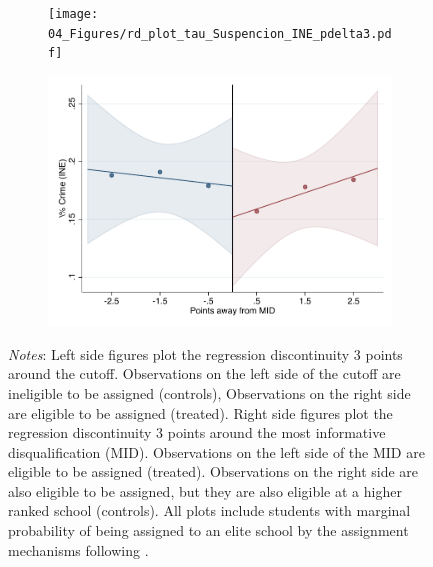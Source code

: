 \documentclass[oneside,11pt]{article}
\begin{document}
\begin{figure}[H]
\begin{center}
    \begin{subfigure}{0.475\textwidth}
        \centering
        \texttt{[image: 04\_Figures/rd\_plot\_tau\_Suspencion\_INE\_pdelta3.pdf]}
    \end{subfigure}
    \begin{subfigure}{0.475\textwidth}
        \centering
        \includegraphics[width=\textwidth]{04_Figures/rd_plot_mid_Suspencion_INE_pdelta3.pdf}
    \end{subfigure}
    \end{center}
    
\footnotesize
\textit{Notes}: Left side figures plot the regression discontinuity 3 points around the cutoff. Observations on the left side of the cutoff are ineligible to be assigned (controls), Observations on the right side are eligible to be assigned (treated). Right side figures plot the regression discontinuity 3 points around the most informative disqualification (MID). Observations on the left side of the MID are eligible to be assigned (treated). Observations on the right side are also eligible to be assigned, but they are also eligible at a higher ranked school (controls). All plots include students with marginal probability of being assigned to an elite school by the assignment mechanisms following \citet{abdulkadirouglu2022breaking}. 
\end{figure}
\end{document}
